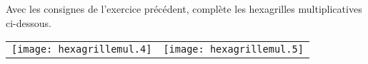 Avec les consignes de l'exercice précédent, complète les hexagrilles
multiplicatives ci-dessous.
\begin{center}
  \begin{tabular}{cc}
\texttt{[image: hexagrillemul.4]}&\texttt{[image: hexagrillemul.5]}\\    
  \end{tabular}
\end{center}

